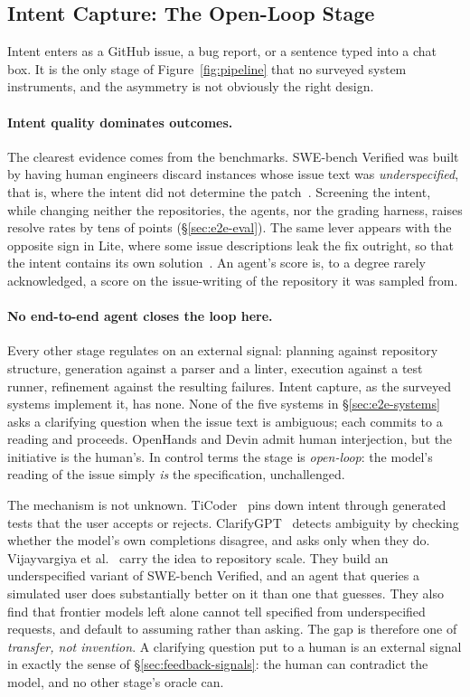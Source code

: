 \documentclass[
  english,        %
  font=times,     %
  twocolumn,      %
]{tumarticle}
\begin{document}
\subsection{Intent Capture: The Open-Loop Stage}
\label{sec:intent}

Intent enters as a GitHub issue, a bug report, or a sentence typed into a chat
box. It is the only stage of Figure~\ref{fig:pipeline} that no surveyed system
instruments, and the asymmetry is not obviously the right design.

\paragraph{Intent quality dominates outcomes.}
The clearest evidence comes from the benchmarks. SWE-bench Verified was built by
having human engineers discard instances whose issue text was
\emph{underspecified}, that is, where the intent did not determine the
patch~\cite{openai2024verified}. Screening the intent, while changing neither the
repositories, the agents, nor the grading harness, raises resolve rates by tens
of points (\S\ref{sec:e2e-eval}). The same lever appears with the opposite sign
in Lite, where some issue descriptions leak the fix outright, so that the intent
contains its own solution~\cite{xia2024agentless}. An agent's score is, to a
degree rarely acknowledged, a score on the issue-writing of the repository it was
sampled from.

\paragraph{No end-to-end agent closes the loop here.}
Every other stage regulates on an external signal: planning against repository
structure, generation against a parser and a linter, execution against a test
runner, refinement against the resulting failures. Intent capture, as the
surveyed systems implement it, has none. None of the five systems in
\S\ref{sec:e2e-systems} asks a clarifying question when the issue text is
ambiguous; each commits to a reading and proceeds. OpenHands and Devin admit
human interjection, but the initiative is the human's. In control terms the stage
is \emph{open-loop}: the model's reading of the issue simply \emph{is} the
specification, unchallenged.

The mechanism is not unknown. TiCoder~\cite{lahiri2022ticoder} pins down intent
through generated tests that the user accepts or rejects.
ClarifyGPT~\cite{mu2024clarifygpt} detects ambiguity by checking whether the
model's own completions disagree, and asks only when they do. Vijayvargiya et
al.~\cite{vijayvargiya2026ambiguity} carry the idea to repository scale. They
build an underspecified variant of SWE-bench Verified, and an agent that queries a
simulated user does substantially better on it than one that guesses. They also
find that frontier models left alone cannot tell specified from underspecified
requests, and default to assuming rather than asking. The gap is therefore one of
\emph{transfer, not invention}. A clarifying question put to a human is an
external signal in exactly the sense of \S\ref{sec:feedback-signals}: the human
can contradict the model, and no other stage's oracle can.
\end{document}
